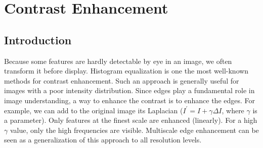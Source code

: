 \chapter{Contrast Enhancement}
\section{Introduction}
Because some features are hardly detectable by eye in an image, we
often transform it before display. Histogram equalization is
one the most well-known methods for contrast enhancement.
Such an approach is generally useful for images
with a poor  intensity distribution. Since edges play a fundamental 
role in image understanding, a way to enhance the contrast is to 
enhance the edges. For example, we can add to the original image its Laplacian
($I^{'}= I + \gamma \Delta I$, where $\gamma$ is a parameter). Only
features at the finest scale are enhanced (linearly). For a high 
$\gamma$ value, only the high frequencies are visible.
Multiscale edge enhancement \cite{col:velde99} can be seen 
as a generalization of this approach to all resolution levels.  
 
